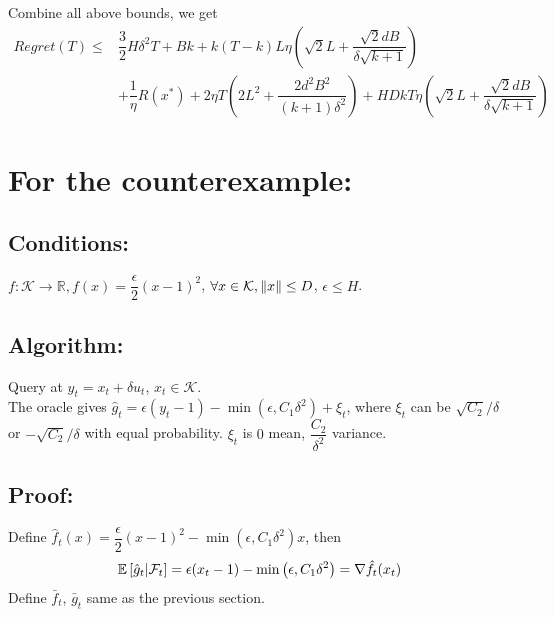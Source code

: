 \documentclass[11pt,letterpaper,english]{article}
\begin{document}
Combine all above bounds, we get
\begin{align*}
Regret(T) \leq& \dfrac{3}{2} H\delta^2T+ 
Bk + k(T-k)L \eta ( \sqrt{2}L+\dfrac{\sqrt{2}dB}{\delta\sqrt{k+1}} ) \\
&+ \dfrac{1}{\eta} R(x^*) + 2\eta T (2L^2+ \dfrac{2d^2B^2}{(k+1)\delta^2}) +HD kT \eta ( \sqrt{2}L+\dfrac{\sqrt{2}dB}{\delta\sqrt{k+1}} ) 
\end{align*}

\section*{For the counterexample: }
\subsection*{Conditions: }
$f: \mathcal{K}\to \mathbb{R}, f(x) = \dfrac{\epsilon}{2}(x-1)^2$, $\forall x \in \mathcal{K}, \|x\| \leq D$, $\epsilon \leq H$.

\subsection*{Algorithm: }
Query at $y_t = x_t + \delta u_t$, $x_t \in \mathcal{K}$. \\
The oracle gives $\hat{g}_t = \epsilon (y_t - 1)-\min\left( \epsilon, C_1\delta^2  \right)+\xi_t $, where $\xi_t$ can be $\sqrt{C_2}/\delta$ or $-\sqrt{C_2}/\delta$ with equal probability. $\xi_t$ is $0$ mean, $\dfrac{C_2}{\delta^2}$ variance.

\subsection*{Proof: }
Define $\hat{f}_t(x) = \dfrac{\epsilon}{2}(x-1)^2-\min\left( \epsilon, C_1\delta^2   \right)x$, then 
\begin{align*}
\mathbb{E}\left[\hat{g}_t | \mathcal{F}_t \right]= \epsilon (x_t - 1)-\min\left( \epsilon, C_1\delta^2  \right) = \nabla \hat{f}_t(x_t)
\end{align*}
Define $\bar{f}_t $, $\bar{g}_t $ same as the previous section. 
\end{document}
